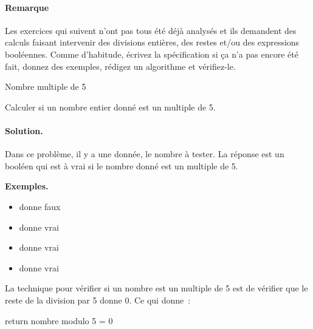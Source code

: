 \bigskip
\bigskip
\bigskip
\begin{Emphase}
	
	\paragraph{Remarque}
	Les exercices qui suivent n’ont pas tous été déjà analysés et ils demandent
	des calculs faisant intervenir des divisions entières, des restes et/ou des
	expressions booléennes.  Comme d’habitude, écrivez la spécification si ça
	n’a pas encore été fait, donnez des exemples, rédigez un algorithme et
	vérifiez-le.

\end{Emphase}

		\begin{Exercice}{Nombre multiple de 5}

			\label{algo:mult5}
			Calculer si un nombre entier donné est un multiple de 5.

			\clearpage
			\paragraph{Solution.}
			Dans ce problème,
			il y a une donnée, le nombre à tester.
			La réponse est un booléen
			qui est à vrai si le nombre donné est un multiple de 5.
			\begin{center}
			\end{center}
			\textbf{Exemples.}
			\begin{multicols}{4}
				\begin{itemize}
					\item {} donne faux
					\item {} donne vrai
					\item {} donne vrai
					\item {} donne vrai
				\end{itemize}
			\end{multicols}
			La technique pour vérifier si un nombre est
			un multiple de 5 est de vérifier que le reste
			de la division par 5 donne 0.
			Ce qui donne~:
			\begin{langagenaturel}
				return nombre modulo 5 = 0
			\end{langagenaturel}
		

\end{Exercice}
